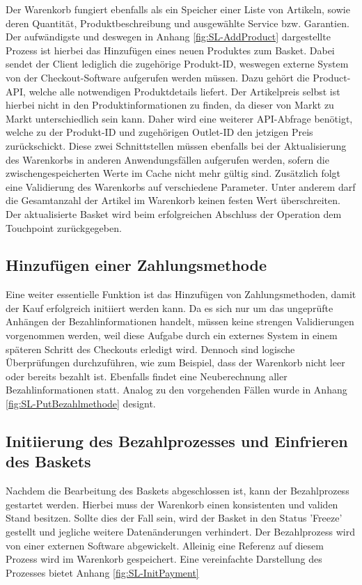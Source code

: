Der Warenkorb fungiert ebenfalls als ein Speicher einer Liste von Artikeln, sowie deren Quantität, Produktbeschreibung und ausgewählte Service bzw. Garantien. Der aufwändigste und deswegen in Anhang \ref{fig:SL-AddProduct} dargestellte Prozess ist hierbei das Hinzufügen eines neuen Produktes zum Basket. Dabei sendet der Client lediglich die zugehörige Produkt-ID, weswegen externe System von der Checkout-Software aufgerufen werden müssen. Dazu gehört die Product-API, welche alle notwendigen Produktdetails liefert. Der Artikelpreis selbst ist hierbei nicht in den Produktinformationen zu finden, da dieser von Markt zu Markt unterschiedlich sein kann. Daher wird eine weiterer API-Abfrage benötigt, welche zu der Produkt-ID und zugehörigen Outlet-ID den jetzigen Preis zurückschickt. Diese zwei Schnittstellen müssen ebenfalls bei der Aktualisierung des Warenkorbs in anderen Anwendungsfällen aufgerufen werden, sofern die zwischengespeicherten Werte im Cache nicht mehr gültig sind. Zusätzlich folgt eine Validierung des Warenkorbs auf verschiedene Parameter. Unter anderem darf die Gesamtanzahl der Artikel im Warenkorb keinen festen Wert überschreiten. Der aktualisierte Basket wird beim erfolgreichen Abschluss der Operation dem Touchpoint zurückgegeben.



\subsection{Hinzufügen einer Zahlungsmethode}

Eine weiter essentielle Funktion ist das Hinzufügen von Zahlungsmethoden, damit der Kauf erfolgreich initiiert werden kann. Da es sich nur um das ungeprüfte Anhängen der Bezahlinformationen handelt, müssen keine strengen Validierungen vorgenommen werden, weil diese Aufgabe durch ein externes System in einem späteren Schritt des Checkouts erledigt wird. Dennoch sind logische Überprüfungen durchzuführen, wie zum Beispiel, dass der Warenkorb nicht leer oder bereits bezahlt ist. Ebenfalls findet eine Neuberechnung aller Bezahlinformationen statt. Analog zu den vorgehenden Fällen wurde in Anhang \ref{fig:SL-PutBezahlmethode} designt.

\subsection{Initiierung des Bezahlprozesses und Einfrieren des Baskets}

Nachdem die Bearbeitung des Baskets abgeschlossen ist, kann der Bezahlprozess gestartet werden. Hierbei muss der Warenkorb einen konsistenten und validen Stand besitzen. Sollte dies der Fall sein, wird der Basket in den Status 'Freeze' gestellt und jegliche weitere Datenänderungen verhindert. Der Bezahlprozess wird von einer externen Software abgewickelt. Alleinig eine Referenz auf diesem Prozess wird im Warenkorb gespeichert. Eine vereinfachte Darstellung des Prozesses bietet Anhang \ref{fig:SL-InitPayment}

